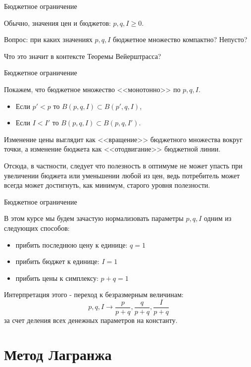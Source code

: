 \documentclass{beamer}
\begin{document}
\begin{frame}{Бюджетное ограничение}

Обычно, значения цен и бюджетов: $p,q,I \geqslant 0$. 

Вопрос: при каких значениях $p,q,I$ бюджетное множество компактно? Непусто? 

Что это значит в контексте Теоремы Вейерштрасса?

\end{frame}

\begin{frame}{Бюджетное ограничение}

Покажем, что бюджетное множество <<монотонно>> по $p,q,I$.

\begin{itemize}
  \item Если $p'<p$ то $B(p,q,I) \subset B(p',q,I)$,
  \item Если $I<I'$ то $B(p,q,I) \subset B(p,q,I')$.
\end{itemize}

Изменение цены выглядит как <<вращение>> бюджетного множества вокруг точки, а изменение бюджета как <<отодвигание>> бюджетной линии.

Отсюда, в частности, следует что полезность в оптимуме не может упасть при увеличении бюджета или уменьшении любой из цен, ведь потребитель может всегда может достигнуть, как минимум, старого уровня полезности.

\end{frame}

\begin{frame}{Бюджетное ограничение}

В этом курсе мы будем зачастую нормализовать параметры $p,q,I$ одним из следующих способов:

\begin{itemize}
  \item прибить последнюю цену к единице: $q = 1$
  \item прибить бюджет к единице: $I = 1$
  \item прибить цены к симплексу: $p + q = 1$
\end{itemize}

Интерпретация этого - переход к безразмерным величинам:
$$ p,q,I \to \frac{p}{p+q},\frac{q}{p+q},\frac{I}{p+q}$$
за счет деления всех денежных параметров на константу.

\end{frame}

\section{Метод Лагранжа}
\end{document}
